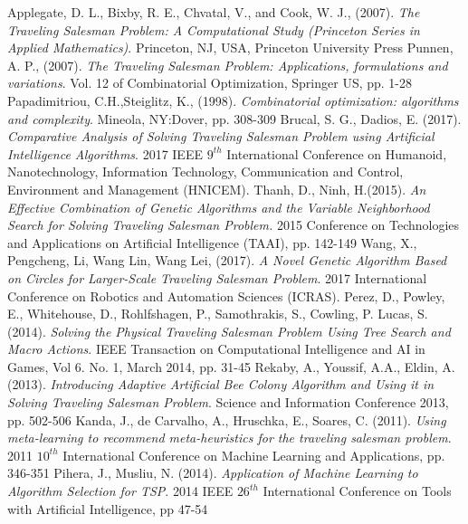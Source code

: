 \documentclass[twocolumn]{article}
\begin{document}
	\begin{thebibliography}{999}
		Applegate, D. L., Bixby, R. E., Chvatal, V.,  and Cook, W. J., (2007).
		\emph{The Traveling Salesman Problem: A Computational Study (Princeton Series in Applied Mathematics)}.
		Princeton, NJ, USA,
		Princeton University Press
		Punnen, A. P., (2007).
		\emph{The Traveling Salesman Problem: Applications, formulations and variations}.
		Vol. 12 of Combinatorial Optimization,
		Springer US,
		pp. 1-28
		Papadimitriou, C.H.,Steiglitz, K., (1998).
		\emph{Combinatorial optimization: algorithms and complexity}. Mineola, NY:Dover,
		pp. 308-309
		Brucal, S. G., Dadios, E. (2017).
		\emph{Comparative Analysis of Solving Traveling Salesman Problem using Artificial Intelligence Algorithms}.
		2017 IEEE $9^{th}$ International Conference on Humanoid, Nanotechnology, Information Technology, Communication and Control, Environment and Management (HNICEM).
		Thanh, D., Ninh, H.(2015).
		\emph{An Effective Combination of Genetic Algorithms and the Variable Neighborhood Search for Solving Traveling Salesman Problem.}
		2015 Conference on Technologies and Applications on Artificial Intelligence (TAAI),
		pp. 142-149
		Wang, X., Pengcheng, Li, Wang Lin, Wang Lei, (2017).
		\emph{A Novel Genetic Algorithm Based on Circles for Larger-Scale Traveling Salesman Problem}. 2017 International Conference on Robotics and Automation Sciences (ICRAS).
		Perez, D., Powley, E., Whitehouse, D., Rohlfshagen, P., Samothrakis, S., Cowling, P. Lucas, S. (2014).
		\emph{Solving the Physical Traveling Salesman Problem Using Tree Search and Macro Actions}. IEEE Transaction on Computational Intelligence and AI in Games, Vol 6. No. 1, March 2014,
		pp. 31-45
		Rekaby, A., Youssif, A.A., Eldin, A. (2013).
		\emph{Introducing Adaptive Artificial Bee Colony Algorithm and Using it in Solving Traveling Salesman Problem}.
		Science and Information Conference 2013,
		pp. 502-506
		Kanda, J., de Carvalho, A., Hruschka, E., Soares, C. (2011).
		\emph{Using meta-learning to recommend meta-heuristics for the traveling salesman problem}. 2011 $10^{th}$ International Conference on Machine Learning and Applications,
		pp. 346-351
		Pihera, J., Musliu, N. (2014).
		\emph{Application of Machine Learning to Algorithm Selection for TSP}. 2014 IEEE $26^{th}$ International Conference on Tools with Artificial Intelligence,
		pp 47-54

\end{thebibliography}
\end{document}
